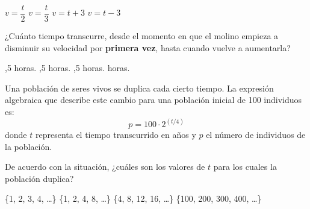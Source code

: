 \documentclass[10pt,letterpaper,addpoints]{exam}
\begin{document}
\begin{questions}
\begin{oneparchoices}
\CorrectChoice $v=\dfrac{t}{2}$
\choice $v=\dfrac{t}{3}$
\choice $v=t+3$
\choice $v=t-3$
\end{oneparchoices}
\question ¿Cuánto tiempo transcurre, desde el momento en que el molino empieza a disminuir su velocidad por \textbf{primera vez}, hasta cuando vuelve a aumentarla?

\begin{oneparchoices}
,5 horas.
,5 horas.
,5 horas.
 horas.
\end{oneparchoices}
\question Una población de seres vivos se duplica cada cierto tiempo. La expresión algebraica que describe este cambio para una población inicial de 100 individuos es:
\[p=100\cdot 2^{(t/4)}\]
donde $t$ representa el tiempo transcurrido en años y $p$ el número de individuos de la población.

De acuerdo con la situación, ¿cuáles son los valores de $t$ para los cuales la población duplica?
\begin{multicols}{2}
\begin{choices}
\choice \{1, 2, 3, 4, \ldots \}
\choice \{1, 2, 4, 8, \ldots \}
\CorrectChoice \{4, 8, 12, 16, \ldots \}
\choice \{100, 200, 300, 400, \ldots \}
\end{choices}
\end{multicols}

\end{questions}
\end{document}
